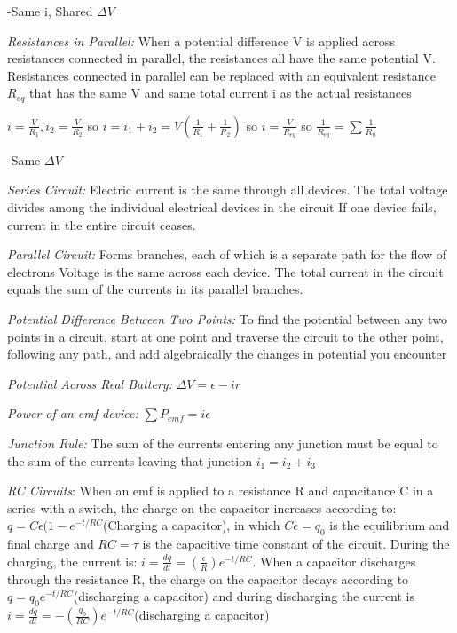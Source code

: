 \documentclass[english]{article}
\begin{document}
-Same i, Shared $\Delta V$

\emph{Resistances in Parallel:} When a potential difference V is applied
across resistances connected in parallel, the resistances all have
the same potential V. Resistances connected in parallel can be replaced
with an equivalent resistance $R{}_{eq}$ that has the same V and
same total current i as the actual resistances

$i=\frac{V}{R_{1}},i_{2}=\frac{V}{R_{2}}$ so $i=i_{1}+i_{2}=V(\frac{1}{R_{1}}+\frac{1}{R_{2}})$
so $i=\frac{V}{R_{eq}}$ so $\frac{1}{R_{eq}}=\sum\frac{1}{R_{n}}$

-Same $\varDelta V$

\emph{Series Circuit: }Electric current is the same through all devices.
The total voltage divides among the individual electrical devices
in the circuit If one device fails, current in the entire circuit
ceases.

\emph{Parallel Circuit: }Forms branches, each of which is a separate
path for the flow of electrons Voltage is the same across each device.
The total current in the circuit equals the sum of the currents in
its parallel branches.

\emph{Potential Difference Between Two Points:} To find the potential
between any two points in a circuit, start at one point and traverse
the circuit to the other point, following any path, and add algebraically
the changes in potential you encounter

\emph{Potential Across Real Battery: }$\varDelta V=\epsilon-ir$

\emph{Power of an emf device: }$\sum$$P_{emf}=i\epsilon$

\emph{Junction Rule:} The sum of the currents entering any junction
must be equal to the sum of the currents leaving that junction $i_{1}=i_{2}+i_{3}$

\emph{RC Circuits}: When an emf is applied to a resistance R and capacitance
C in a series with a switch, the charge on the capacitor increases
according to: $q=C\epsilon(1-e^{-t/RC}$(Charging a capacitor), in
which $C\epsilon=q_{0}$ is the equilibrium and final charge and $RC=\tau$
is the capacitive time constant of the circuit. During the charging,
the current is: $i=\frac{dq}{dt}=(\frac{\epsilon}{R})e^{-t/RC}$.
When a capacitor discharges through the resistance R, the charge on
the capacitor decays according to $q=q_{0}e^{-t/RC}$(discharging
a capacitor) and during discharging the current is $i=\frac{dq}{dt}=-(\frac{q_{0}}{RC})e^{-t/RC}$(discharging
a capacitor)
\end{document}
